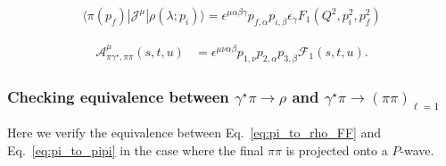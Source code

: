 \begin{align}
\langle \pi(p_f)|\mathcal{J}^\mu|\rho(\lambda; p_i)\rangle
=
\epsilon^{\mu\alpha\beta\gamma}p_{f,\alpha}p_{i,\beta}\epsilon_\gamma F_1(Q^2,p_i^2,p_f^2)
\label{eq:pi_to_rho_FF}
\end{align}

\begin{align}
\mathcal{A}^{\mu}_{\pi\gamma^\star,\pi\pi}(s,t,u)&=
\epsilon^{\mu\nu\alpha\beta}p_{1,\nu}p_{2,\alpha}p_{3,\beta}\mathcal{F}_{1}(s,t,u).
\label{eq:pi_to_pipi}
\end{align}

 
\subsubsection{Checking equivalence between $\gamma^\star\pi\to\rho$ and $\gamma^\star\pi\to(\pi\pi)_{\ell=1}$}
Here we verify the equivalence between Eq.~\ref{eq:pi_to_rho_FF} and Eq.~\ref{eq:pi_to_pipi} in the case where the final $\pi\pi$ is projected onto a $P$-wave. 


